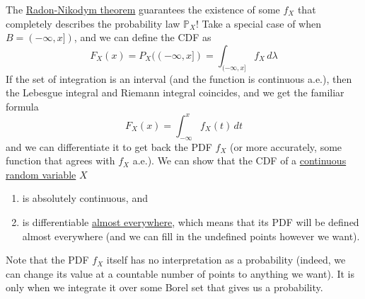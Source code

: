   The \hyperref[mt-thm:rn-der]{Radon-Nikodym theorem} guarantees the existence of some $f_X$ that completely describes the probability law $\mathbb{P}_X$! Take a special case of when $B = (-\infty, x])$, and we can define the CDF as 
  \begin{equation}
    F_X (x) = P_X ((-\infty, x]) = \int_{(-\infty, x]} f_X \, d\lambda
  \end{equation}
  If the set of integration is an interval (and the function is continuous a.e.), then the Lebesgue integral and Riemann integral coincides, and we get the familiar formula 
  \begin{equation}
    F_X (x) = \int_{-\infty}^x f_X (t)\,dt
  \end{equation}
  and we can differentiate it to get back the PDF $f_X$ (or more accurately, some function that agrees with $f_X$ a.e.). We can show that the CDF of a \hyperref[def:continuous-random-variable]{continuous random variable} $X$
  \begin{enumerate}
    \item is absolutely continuous, and 
    \item is differentiable \hyperref[mt-def:almost_everywhere]{almost everywhere}, which means that its PDF will be defined almost everywhere (and we can fill in the undefined points however we want). 
  \end{enumerate}
  Note that the PDF $f_X$ itself has no interpretation as a probability (indeed, we can change its value at a countable number of points to anything we want). It is only when we integrate it over some Borel set that gives us a probability. 


